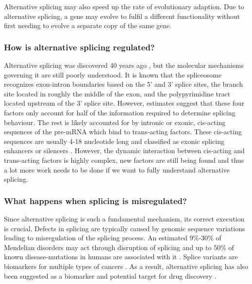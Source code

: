 Alternative splicing may also speed up the rate of evolutionary adaption. Due to alternative splicing, a gene may evolve to fulfil a different functionality without first needing to evolve a separate copy of the same gene. \cite{bretschneiderphdthesis}
\subsubsection{How is alternative splicing regulated?}
Alternative splicing was discovered 40 years ago \cite{discoveryofsplicing}, but the molecular mechanisms governing it are still poorly understood. It is known that the spliceosome recognizes exon-intron boundaries based on the 5' and 3' splice sites, the branch site located in roughly the middle of the exon, and the polypyrimidine tract located upstream of the 3' splice site. However, estimates suggest that these four factors only account for half of the information required to determine splicing behaviour. The rest is likely accounted for by intronic or exonic, cis-acting sequences of the pre-mRNA which bind to trans-acting factors. These cis-acting sequences are usually 4-18 nucleotide long and classified as exonic splicing enhancers or silencers \cite{splicing_current_perspectives}.
However, the dynamic interaction between cis-acting and trans-acting factors is highly complex, new factors are still being found and thus a lot more work needs to be done if we want to fully understand alternative splicing.

\subsubsection{What happens when splicing is misregulated?}
Since alternative splicing is such a fundamental mechanism, its correct execution is crucial. Defects in splicing are typically caused by genomic sequence variations leading to misregulation of the splicing process. An estimated 9\%-30\% of Mendelian disorders may act through disruption of splicing \cite{comparison} and up to 50\% of known disease-mutations in humans are associated with it \cite{50diseasessplicing}. 
Splice variants are biomarkers for multiple types of cancers \cite{cancer} \cite{splicingcausescancer}. As a result, alternative splicing has also been suggested as a biomarker and potential target for drug discovery \cite{drugdiscoverysplicing}. \\

